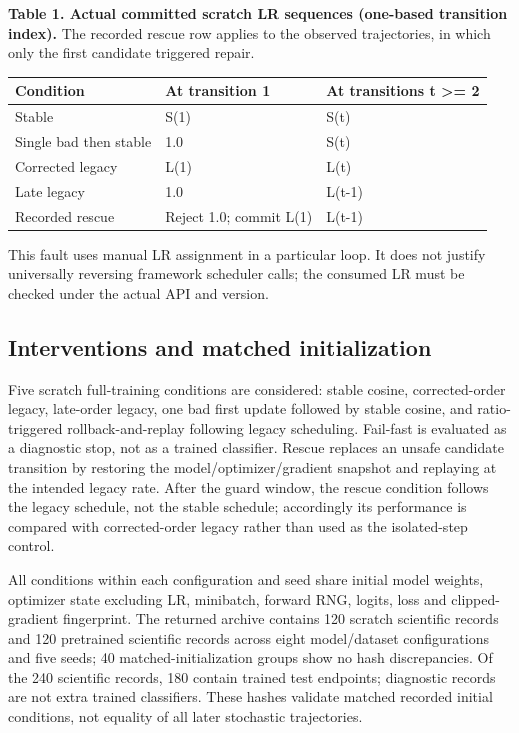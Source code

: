 \documentclass[referee,pdflatex,sn-mathphys-num]{sn-jnl}
\begin{document}

\textbf{Table 1. Actual committed scratch LR sequences (one-based transition index).} The recorded rescue row applies to the observed trajectories, in which only the first candidate triggered repair.

\begin{longtable}[]{@{}lll@{}}
\toprule\noalign{}
Condition & At transition 1 & At transitions t \textgreater= 2 \\
\midrule\noalign{}
\endhead
\bottomrule\noalign{}
\endlastfoot
Stable & S(1) & S(t) \\
Single bad then stable & 1.0 & S(t) \\
Corrected legacy & L(1) & L(t) \\
Late legacy & 1.0 & L(t-1) \\
Recorded rescue & Reject 1.0; commit L(1) & L(t-1) \\
\end{longtable}

This fault uses manual LR assignment in a particular loop. It does not justify universally reversing framework scheduler calls; the consumed LR must be checked under the actual API and version.

\subsection{Interventions and matched initialization}\label{interventions-and-matched-initialization}

Five scratch full-training conditions are considered: stable cosine, corrected-order legacy, late-order legacy, one bad first update followed by stable cosine, and ratio-triggered rollback-and-replay following legacy scheduling. Fail-fast is evaluated as a diagnostic stop, not as a trained classifier. Rescue replaces an unsafe candidate transition by restoring the model/optimizer/gradient snapshot and replaying at the intended legacy rate. After the guard window, the rescue condition follows the legacy schedule, not the stable schedule; accordingly its performance is compared with corrected-order legacy rather than used as the isolated-step control.

All conditions within each configuration and seed share initial model weights, optimizer state excluding LR, minibatch, forward RNG, logits, loss and clipped-gradient fingerprint. The returned archive contains 120 scratch scientific records and 120 pretrained scientific records across eight model/dataset configurations and five seeds; 40 matched-initialization groups show no hash discrepancies. Of the 240 scientific records, 180 contain trained test endpoints; diagnostic records are not extra trained classifiers. These hashes validate matched recorded initial conditions, not equality of all later stochastic trajectories.
\end{document}
